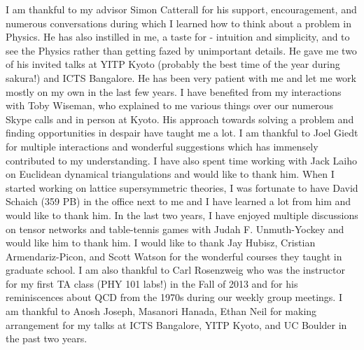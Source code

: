 \vspace*{2em}
I am thankful to my advisor Simon Catterall for his support, encouragement, and 
numerous conversations during which I learned how to 
think about a problem in Physics. He has also instilled in me, a taste for - 
intuition and simplicity, and to see the Physics rather than getting fazed by 
unimportant details. He gave me two of his invited talks at YITP Kyoto 
(probably the best time of the year during sakura!) and ICTS Bangalore. He has been 
very patient with me and let me work mostly on my own in the last few years. 
I have benefited from my interactions with Toby Wiseman, who explained to me various things
over our numerous Skype calls and in person at Kyoto. His approach towards solving a problem and finding 
opportunities in despair have taught me a lot. I am thankful to Joel Giedt for multiple interactions 
and wonderful suggestions which has immensely contributed to my understanding.  
I have also spent time working with Jack Laiho on Euclidean dynamical triangulations and would like to thank
him. When I started working on lattice supersymmetric theories, 
I was fortunate to have David Schaich (359 PB) in the office next to me and I 
have learned a lot from him and would like to thank him. In the last two years, 
I have enjoyed multiple discussions on tensor networks and table-tennis games 
with Judah F. Unmuth-Yockey and would like him to thank him. I would like to thank 
Jay Hubisz, Cristian Armendariz-Picon, and Scott Watson 
for the wonderful courses they taught in graduate school. I am also thankful to 
Carl Rosenzweig who was the instructor for my first TA class (PHY 101 labs!) in the Fall 
of 2013 and for his reminiscences about QCD from the 1970s during our weekly group meetings.
I am thankful to Anosh Joseph, Masanori Hanada, Ethan Neil for
making arrangement for my talks at ICTS Bangalore, YITP Kyoto, and UC Boulder in 
the past two years.  


